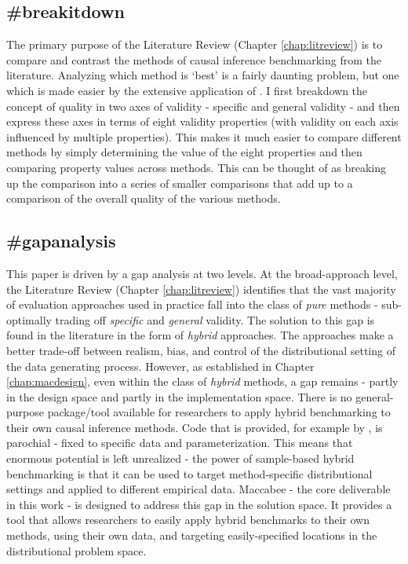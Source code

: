 \documentclass[./main.tex]{subfiles}
\begin{document}

\subsection*{\textbf{\#breakitdown}}
\label{hc:breakitdown}

The primary purpose of the Literature Review (Chapter \ref{chap:litreview}) is to compare and contrast the methods of causal inference benchmarking from the literature. Analyzing which method is `best' is a fairly daunting problem, but one which is made easier by the extensive application of . I first breakdown the concept of quality in two axes of validity - specific and general validity - and then express these axes in terms of eight validity properties (with validity on each axis influenced by multiple properties). This makes it much easier to compare different methods by simply determining the value of the eight properties and then comparing property values across methods. This can be thought of as breaking up the comparison into a series of smaller comparisons that add up to a comparison of the overall quality of the various methods.


\subsection*{\textbf{\#gapanalysis}}
\label{hc:gapanalysis}

This paper is driven by a gap analysis at two levels. At the broad-approach level, the Literature Review (Chapter \ref{chap:litreview}) identifies that the vast majority of evaluation approaches used in practice fall into the class of \textit{pure} methods - sub-optimally trading off \textit{specific} and \textit{general} validity. The solution to this gap is found in the literature in the form of \textit{hybrid} approaches. The approaches make a better trade-off between realism, bias, and control of the distributional setting of the data generating process. However, as established in Chapter \ref{chap:macdesign}, even within the class of \textit{hybrid} methods, a gap remains - partly in the design space and partly in the implementation space. There is no general-purpose package/tool available for researchers to apply hybrid benchmarking to their own causal inference methods. Code that is provided, for example by \textcite{Dorie2019Automated1}, is parochial - fixed to specific data and parameterization. This means that enormous potential is left unrealized - the power of sample-based hybrid benchmarking is that it can be used to target method-specific distributional settings and applied to different empirical data. Maccabee - the core deliverable in this work - is designed to address this gap in the solution space. It provides a tool that allows researchers to easily apply hybrid benchmarks to their own methods, using their own data, and targeting easily-specified locations in the distributional problem space.
\end{document}
